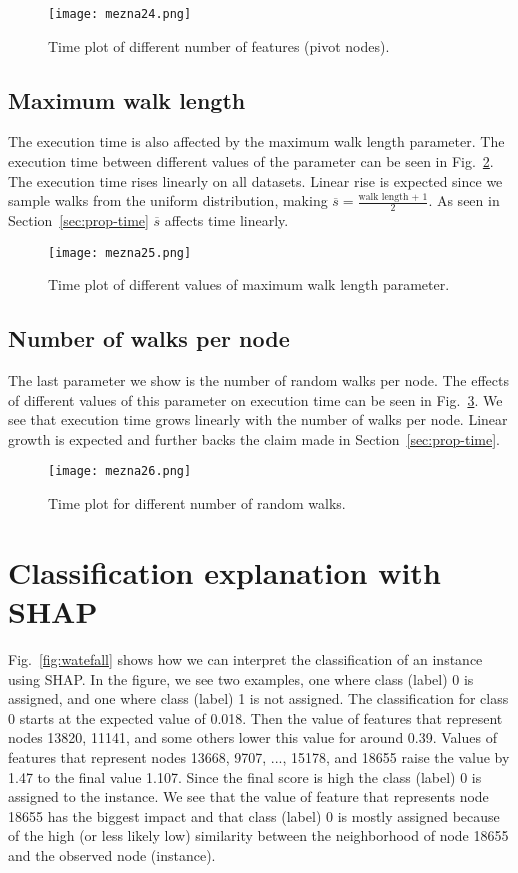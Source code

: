 \documentclass[twoside,11pt]{article}
\begin{document}
\begin{figure}[t!]
  \centering
  \texttt{[image: mezna24.png]}
  \caption{Time plot of different number of features (pivot nodes).}
  \label{fig:timenf}
\end{figure}

\subsection{Maximum walk length}
The execution time is also affected by the maximum walk length parameter. The execution time between different values of the parameter can be seen in Fig.~\ref{fig:timelength}. The execution time rises linearly on all datasets. Linear rise is expected since we sample walks from the uniform distribution, making $\overline{s}=\frac{\textrm{walk length + 1}}{2}$. As seen in Section~\ref{sec:prop-time} $\overline{s}$ affects time linearly.

\begin{figure}[t!]
  \centering
  \texttt{[image: mezna25.png]}
  \caption{Time plot of different values of maximum walk length parameter.}
  \label{fig:timelength}
\end{figure}

\subsection{Number of walks per node}
The last parameter we show is the number of random walks per node. The effects of different values of this parameter on execution time can be seen in Fig.~\ref{fig:timewalks}. We see that execution time grows linearly with the number of walks per node. Linear growth is expected and further backs the claim made in Section~\ref{sec:prop-time}.

\begin{figure}[t!]
  \centering
  \texttt{[image: mezna26.png]}
  \caption{Time plot for different number of random walks.}
  \label{fig:timewalks}
\end{figure}

\section{Classification explanation with SHAP}
\label{sec:app-shap}

Fig.~\ref{fig:watefall} shows how we can interpret the classification of an instance using SHAP. In the figure, we see two examples, one where class (label) 0 is assigned, and one where class (label) 1 is not assigned. The classification for class 0 starts at the expected value of 0.018. Then the value of features that represent nodes 13820, 11141, and some others lower this value for around 0.39. Values of features that represent nodes 13668, 9707, ..., 15178, and 18655 raise the value by 1.47 to the final value 1.107. Since the final score is high the class (label) 0 is assigned to the instance. We see that the value of feature that represents node 18655 has the biggest impact and that class (label) 0 is mostly assigned because of the high (or less likely low) similarity between the neighborhood of node 18655 and the observed node (instance).
\end{document}
